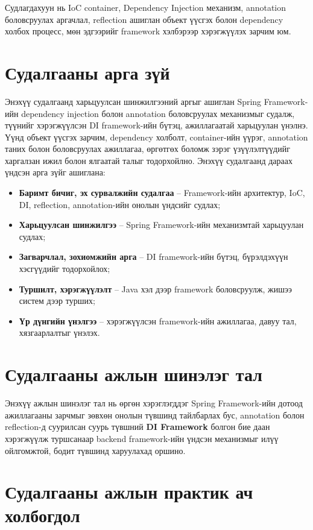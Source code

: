 Судлагдахуун нь IoC container, Dependency Injection механизм, annotation боловсруулах аргачлал, reflection ашиглан объект үүсгэх болон dependency холбох процесс, мөн эдгээрийг framework хэлбэрээр хэрэгжүүлэх зарчим юм.

\section*{Судалгааны арга зүй}
Энэхүү судалгаанд харьцуулсан шинжилгээний аргыг ашиглан Spring Framework-ийн dependency injection болон annotation боловсруулах механизмыг судалж, түүнийг хэрэгжүүлсэн DI framework-ийн бүтэц, ажиллагаатай харьцуулан үнэлнэ. Үүнд объект үүсгэх зарчим, dependency холболт, container-ийн үүрэг, annotation таних болон боловсруулах ажиллагаа, өргөтгөх боломж зэрэг үзүүлэлтүүдийг харгалзан ижил болон ялгаатай талыг тодорхойлно.
Энэхүү судалгаанд дараах үндсэн арга зүйг ашиглана:
\begin{itemize}
    \item \textbf{Баримт бичиг, эх сурвалжийн судалгаа} -- Framework-ийн архитектур, IoC, DI, reflection, annotation-ийн онолын үндсийг судлах;
    \item \textbf{Харьцуулсан шинжилгээ} -- Spring Framework-ийн механизмтай харьцуулан судлах;
    \item \textbf{Загварчлал, зохиомжийн арга} -- DI framework-ийн бүтэц, бүрэлдэхүүн хэсгүүдийг тодорхойлох;
    \item \textbf{Туршилт, хэрэгжүүлэлт} -- Java хэл дээр framework боловсруулж, жишээ систем дээр турших;
    \item \textbf{Үр дүнгийн үнэлгээ} -- хэрэгжүүлсэн framework-ийн ажиллагаа, давуу тал, хязгаарлалтыг үнэлэх.
\end{itemize}

\section*{Судалгааны ажлын шинэлэг тал}

Энэхүү ажлын шинэлэг тал нь өргөн хэрэглэгддэг Spring Framework-ийн дотоод ажиллагааны зарчмыг зөвхөн онолын түвшинд тайлбарлах бус, annotation болон reflection-д суурилсан суурь түвшний \textbf{DI Framework} болгон бие даан хэрэгжүүлж туршсанаар backend framework-ийн үндсэн механизмыг илүү ойлгомжтой, бодит түвшинд харуулахад оршино.

\section*{Судалгааны ажлын практик ач холбогдол}

